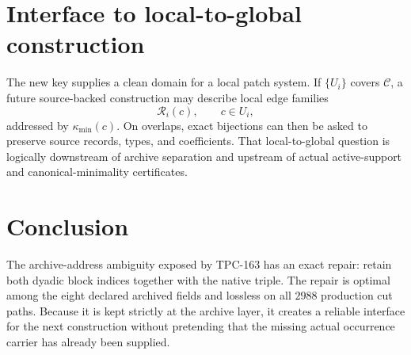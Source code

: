 \documentclass[11pt]{article}
\theoremstyle{definition}
\theoremstyle{remark}
\newcommand{\Kmin}{\kappa_{\min}}
\begin{document}
\section{Interface to local-to-global construction}

The new key supplies a clean domain for a local patch system.  If
\(\{U_i\}\) covers \(\mathcal C\), a future source-backed construction
may describe local edge families
\[
 \mathcal R_i(c),\qquad c\in U_i,
\]
addressed by \(\Kmin(c)\).  On overlaps, exact bijections can then be
asked to preserve source records, types, and coefficients.  That
local-to-global question is logically downstream of archive
separation and upstream of actual active-support and
canonical-minimality certificates.

\section{Conclusion}

The archive-address ambiguity exposed by TPC-163 has an exact repair:
retain both dyadic block indices together with the native triple.
The repair is optimal among the eight declared archived fields and
lossless on all \(2988\) production cut paths.  Because it is kept
strictly at the archive layer, it creates a reliable interface for
the next construction without pretending that the missing actual
occurrence carrier has already been supplied.



\end{document}
